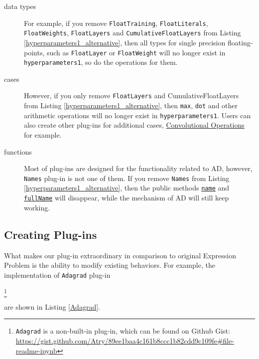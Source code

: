 \begin{description}

  \item[data types] For example, if you remove \lstinline{FloatTraining}, \lstinline{FloatLiterals},  \lstinline{FloatWeights}, \lstinline{FloatLayers} and \lstinline{CumulativeFloatLayers} from Listing \ref{hyperparameters1_alternative}, then all types for single precision floating-points, such as  \lstinline{FloatLayer} or \lstinline{FloatWeight} will no longer exist in \lstinline{hyperparameters1}, so do the operations for them.

  \item[cases] However, if you only remove \lstinline{FloatLayers} and {CumulativeFloatLayers} from Listing \ref{hyperparameters1_alternative}, then \lstinline{max}, \lstinline{dot} and other arithmetic operations will no longer exist in \lstinline{hyperparameters1}. Users can also create other \glspl{plug-in} for additional cases, \href{https://gist.github.com/Atry/15b7d9a4c63d95ad3d67e94bf20b4f69#file-readme-ipynb}{Convolutional Operations} for example.
  
  \item[functions] Most of \glspl{plug-in} are designed for the functionality related to AD, however, \lstinline{Names} \gls{plug-in} is not one of them. If you remove \lstinline{Names} from Listing \ref{hyperparameters1_alternative}, then the public methods \href{https://javadoc.io/page/com.thoughtworks.deeplearning/deeplearning_2.11/latest/com/thoughtworks/deeplearning/plugins/Names%24Layer.html#name:sourcecode.Name}{\lstinline{name}} and \href{https://javadoc.io/page/com.thoughtworks.deeplearning/deeplearning_2.11/latest/com/thoughtworks/deeplearning/plugins/Names%24Layer.html#fullName:sourcecode.FullName}{\lstinline{fullName}} will disappear, while the mechanism of AD will still keep working.

\end{description}


\subsection{Creating Plug-ins}

What makes our \gls{plug-in} extraordinary in comparison to original Expression Problem is the ability to modify existing behaviors. For example, the implementation of \lstinline{Adagrad} \gls{plug-in}
\begin{anonsuppress}
  \footnote{\lstinline{Adagrad} is a non-built-in \gls{plug-in}, which can be found on Github Gist: \url{https://gist.github.com/Atry/89ee1baa4c161b8ccc1b82cdd9c109fe#file-readme-ipynb}}
\end{anonsuppress}
are shown in Listing \ref{Adagrad}.

